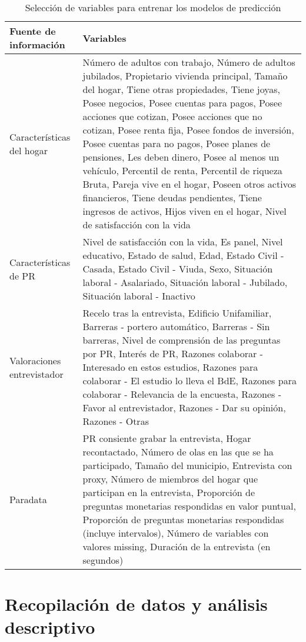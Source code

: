 \begin{table}[htbp]
\centering{}
\begin{tabular}{l p{10cm}}
\hline
\textbf{Fuente de información} & \textbf{Variables} \\ \hline
Características del hogar & Número de adultos con trabajo, Número de adultos jubilados, Propietario vivienda principal, Tamaño del hogar, Tiene otras propiedades, Tiene joyas, Posee negocios, Posee cuentas para pagos, Posee acciones que cotizan, Posee acciones que no cotizan, Posee renta fija, Posee fondos de inversión, Posee cuentas para no pagos, Posee planes de pensiones, Les deben dinero, Posee al menos un vehículo, Percentil de renta, Percentil de riqueza Bruta, Pareja vive en el hogar, Poseen otros activos financieros, Tiene deudas pendientes, Tiene ingresos de activos, Hijos viven en el hogar, Nivel de satisfacción con la vida \\ \hline
Características de PR & Nivel de satisfacción con la vida, Es panel, Nivel educativo, Estado de salud, Edad, Estado Civil - Casada, Estado Civil - Viuda, Sexo, Situación laboral - Asalariado, Situación laboral - Jubilado, Situación laboral - Inactivo \\ \hline
Valoraciones entrevistador & Recelo tras la entrevista, Edificio Unifamiliar, Barreras - portero automático, Barreras - Sin barreras, Nivel de comprensión de las preguntas por PR, Interés de PR, Razones colaborar - Interesado en estos estudios, Razones para colaborar - El estudio lo lleva el BdE, Razones para colaborar - Relevancia de la encuesta, Razones - Favor al entrevistador, Razones - Dar su opinión, Razones - Otras \\ \hline
Paradata & PR consiente grabar la entrevista, Hogar recontactado, Número de olas en las que se ha participado, Tamaño del municipio, Entrevista con proxy, Número de miembros del hogar que participan en la entrevista, Proporción de preguntas monetarias respondidas en valor puntual, Proporción de preguntas monetarias respondidas (incluye intervalos), Número de variables con valores missing, Duración de la entrevista (en segundos) \\ \hline
\end{tabular}
\caption{Selección de variables para entrenar los modelos de predicción}
\label{table:vars}
\end{table}

\section{Recopilación de datos y análisis descriptivo}

